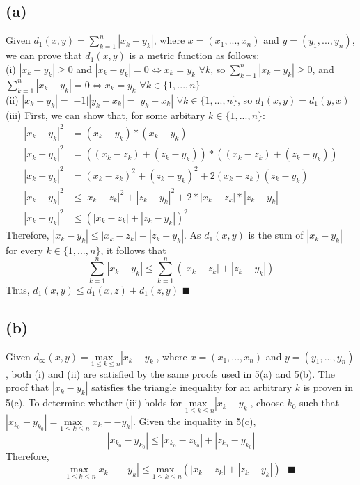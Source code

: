 \documentclass{article}
\newcommand{\usmax}{\underset{1\leq k \leq n}{\text{max }}}
\begin{document}
\subsection*{(a)}
Given $d_1(x,y)=\sum_{k=1}^{n}|x_k-y_k|$, where $x=(x_1,...,x_n)$ and $y=(y_1,...,y_n)$, we can prove that $d_1(x,y)$ is a metric function as follows:
\smallskip \\
\indent (i) $|x_k-y_k|\geq 0$ and $|x_k-y_k|=0 \iff x_k=y_k$ $\forall k$, so $\sum_{k=1}^{n}|x_k-y_k| \geq 0$, and $\sum_{k=1}^{n}|x_k-y_k|=0 \iff x_k=y_k$ $\forall k\in\{1,...,n\}$
\smallskip \\
\indent (ii) $|x_k-y_k|=|-1||y_k-x_k|=|y_k-x_k|$ $\forall k\in\{1,...,n\}$, so $d_1(x,y)=d_1(y,x)$
\smallskip \\
\indent (iii) First, we can show that, for some arbitary $k\in\{1,...,n\}$:
\begin{equation*}
	\begin{split}
		|x_k-y_k|^2 &= 		(x_k-y_k)*(x_k-y_k)									\\
		|x_k-y_k|^2 &= 		((x_k-z_k)+(z_k-y_k))*((x_k-z_k)+(z_k-y_k))			\\
		|x_k-y_k|^2 &= 		(x_k-z_k)^2 + (z_k-y_k)^2 + 2(x_k-z_k)(z_k-y_k)		\\
		|x_k-y_k|^2 &\leq 	|x_k-z_k|^2 + |z_k-y_k|^2 + 2*|x_k-z_k|*|z_k-y_k|	\\
		|x_k-y_k|^2 &\leq	(|x_k-z_k| + |z_k-y_k|)^2
	\end{split}
\end{equation*}
\indent Therefore, $|x_k-y_k| \leq |x_k-z_k| + |z_k-y_k|$. As $d_1(x,y)$ is the sum of $|x_k-y_k|$ for every $k\in\{1,...,n\}$, it follows that
\[
	\sum_{k=1}^{n}|x_k-y_k|\leq \sum_{k=1}^{n}(|x_k-z_k| + |z_k-y_k|)
\]
Thus, $d_1(x,y)\leq d_1(x,z) + d_1(z,y)$ $\blacksquare$
\subsection*{(b)}
Given $d_\infty(x,y)=\usmax |x_k - y_k|$, where $x=(x_1,...,x_n)$ and $y=(y_1,...,y_n)$, both (i) and (ii) are satisfied by the same proofs used in 5(a) and 5(b). The proof that $|x_k - y_k|$ satisfies the triangle inequality for an arbitrary $k$ is proven in 5(c). To determine whether (iii) holds for $\usmax |x_k-y_k|$, choose $k_0$ such that $|x_{k_0}-y_{k_0}|=\usmax |x_k--y_k|$. Given the inquality in 5(c),
\[
	|x_{k_0}-y_{k_0}| \leq |x_{k_0}-z_{k_0}| + |z_{k_0}-y_{k_0}|
\]
Therefore, 
\[
	\usmax |x_k--y_k|\leq \usmax \left(|x_{k}-z_{k}| + |z_{k}-y_{k}|\right)
	\text{ }\blacksquare
\]
\end{document}
